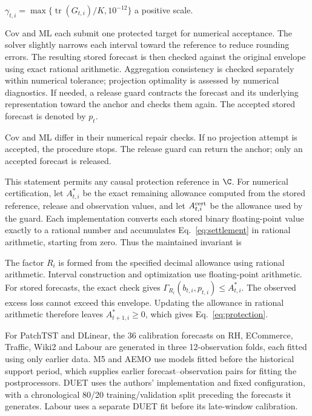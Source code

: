 
$\gamma_{t,i}=\max\{\operatorname{tr}(G_{t,i})/K,10^{-12}\}$ a positive
scale.

Cov and ML each submit one protected target for numerical acceptance.
The solver slightly narrows each interval toward the reference to reduce
rounding errors. The resulting stored forecast is then checked against
the original envelope using exact rational arithmetic. Aggregation consistency is checked separately
within numerical tolerance; projection optimality is assessed by numerical
diagnostics. If needed, a release guard contracts the
forecast and its underlying representation toward the anchor and checks
them again. The accepted stored forecast is denoted by $p_t$.

Cov and ML differ in their numerical repair checks. If no projection
attempt is accepted, the procedure stops. The release guard can return
the anchor; only an accepted forecast is released.

This statement permits any causal protection reference in $\C$.
For numerical certification, let $A_{t,i}^*$ be the exact remaining
allowance computed from the stored reference, release and observation
values, and let $A_{t,i}^{\rm cert}$ be the allowance used by the guard.
Each implementation converts each stored binary floating-point value
exactly to a rational number and accumulates
Eq.~\eqref{eq:settlement} in rational arithmetic, starting from zero.
Thus the maintained invariant is

The factor $R_i$ is formed from the specified decimal allowance using
rational arithmetic.
Interval construction and optimization use floating-point arithmetic.
For stored forecasts, the exact check gives
$\Gamma_{R_i}(b_{t,i},p_{t,i})\le A_{t,i}^*$. The observed excess loss
cannot exceed this envelope. Updating the allowance in rational arithmetic
therefore leaves $A_{t+1,i}^*\ge0$, which gives
Eq.~\eqref{eq:protection}.

For PatchTST and DLinear, the 36 calibration forecasts on RH, ECommerce,
Traffic, Wiki2 and Labour are generated in three 12-observation folds,
each fitted using only earlier data. M5 and AEMO use models fitted before
the historical support period, which supplies earlier forecast--observation
pairs for fitting the postprocessors. DUET uses the authors' implementation
and fixed configuration, with a chronological 80/20 training/validation
split preceding the forecasts it generates. Labour uses a separate DUET
fit before its late-window calibration.

